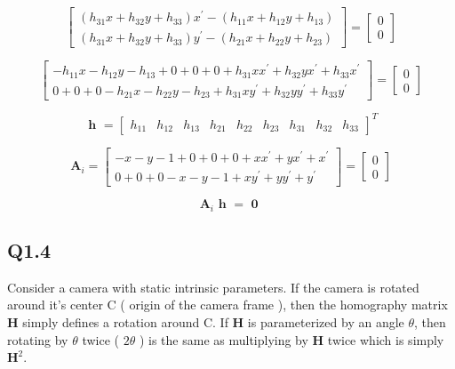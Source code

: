 \documentclass[12pt]{article}
\begin{document}
$$
\begin{bmatrix}
( h_{31} x + h_{32} y + h_{33} ) x^{ \prime } - ( h_{11} x + h_{12} y + h_{13} ) \\
( h_{31} x + h_{32} y + h_{33} ) y^{ \prime } - ( h_{21} x + h_{22} y + h_{23} )
\end{bmatrix}
=
\begin{bmatrix}
0 \\ 0
\end{bmatrix}
$$

$$
\begin{bmatrix}
- h_{11} x 
- h_{12} y 
- h_{13}
+ 0 + 0 + 0
+ h_{31} x  x^{ \prime }
+ h_{32} y  x^{ \prime }
+ h_{33} x^{ \prime }   \\
0 + 0 + 0
- h_{21} x 
- h_{22} y 
- h_{23}
+ h_{31} x y^{ \prime } 
+ h_{32} y y^{ \prime } 
+ h_{33}   y^{ \prime } 
\end{bmatrix}
=
\begin{bmatrix}
0 \\ 0
\end{bmatrix}
$$

$$
\textbf { h } = 
\begin{bmatrix}
h_{11} & h_{12} & h_{13} & h_{21} & h_{22} & h_{23} & h_{31} & h_{32} & h_{33} 
\end{bmatrix}^{T}
$$

$$
\textbf{A}_{i} = 
\begin{bmatrix}
- x 
- y 
- 1
+ 0 + 0 + 0
+ x  x^{ \prime }
+ y  x^{ \prime }
+ x^{ \prime }   \\
0 + 0 + 0
- x 
- y 
- 1
+ x y^{ \prime } 
+ y y^{ \prime } 
+   y^{ \prime } 
\end{bmatrix}
=
\begin{bmatrix}
0 \\ 0
\end{bmatrix}
$$

$$
\textbf{A}_{i} 
\textbf { h } =  \textbf { 0 }
$$


\subsection{Q1.4}
Consider a camera with static intrinsic parameters. If the camera is rotated around it's center C ( origin of the camera frame ), then the homography matrix $\textbf{H}$ simply defines a rotation around C. If  $\textbf{H}$ is parameterized by an angle $\theta$, then rotating by $\theta$ twice ( $2 \theta$ ) is the same as multiplying by $\textbf{H}$ twice which is simply $\textbf{H}^{2}$.
\end{document}
